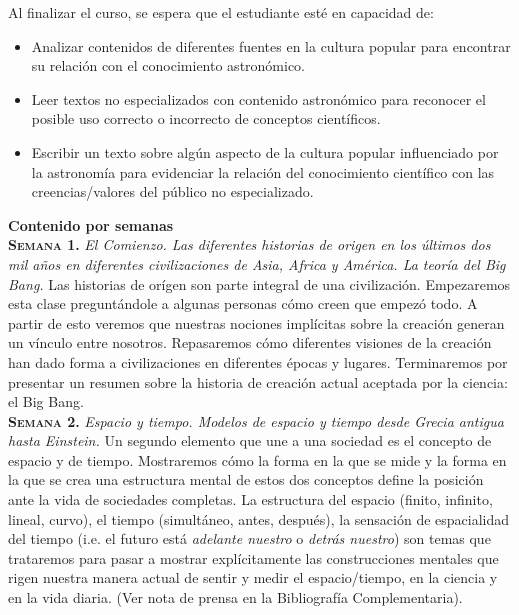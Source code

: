 \documentclass[letterpaper,10pt,onecolumn]{article}
\begin{document}

\noindent\normalsize Al finalizar el curso, se espera que el
estudiante est\'e en capacidad de: 

\begin{itemize}
\item Analizar contenidos de diferentes fuentes en la cultura popular
  para encontrar su relaci\'on con el conocimiento astron\'omico.\\[-0.6cm]
\item Leer textos no especializados con contenido astron\'omico para
  reconocer el posible uso correcto o incorrecto de conceptos cient\'ificos.
\\[-0.6cm]
\item Escribir un texto sobre alg\'un aspecto de la cultura popular
  influenciado por la astronom\'ia para evidenciar la relaci\'on del
  conocimiento cient\'ifico con las creencias/valores del p\'ublico no
  especializado.\\[-0.2cm]  
\end{itemize}

\noindent\textbf{\large {} \quad Contenido por
  semanas}\\[-0.2cm] 


\noindent\normalsize \textbf{\textsc{Semana 1.}} \textit{El Comienzo. Las
diferentes historias de origen en los \'ultimos dos mil a\~nos
en diferentes civilizaciones de Asia, Africa y Am\'erica. La teor\'ia
del Big Bang.} Las historias de or\'igen son parte integral de una
civilizaci\'on. Empezaremos esta clase pregunt\'andole a algunas
personas c\'omo creen que empez\'o todo. A partir de esto veremos que
nuestras nociones impl\'icitas sobre la creaci\'on generan un
v\'inculo entre nosotros. Repasaremos c\'omo diferentes visiones de la
creaci\'on han dado forma a civilizaciones en diferentes
\'epocas y lugares. Terminaremos por presentar un resumen sobre la
historia de creaci\'on actual aceptada por la ciencia: el Big Bang.\\[-0.3cm]   


\noindent\textbf{\textsc{Semana 2.}} \textit{Espacio y tiempo. Modelos de
espacio y tiempo desde Grecia antigua hasta Einstein.} Un segundo
elemento que une a una sociedad es el concepto de espacio y de
tiempo. Mostraremos c\'omo la forma en la que se mide y la forma en la que se crea una
estructura mental de estos dos conceptos define la
posici\'on ante la vida de sociedades completas. La estructura del
espacio (finito, infinito, lineal, curvo), el tiempo (simult\'aneo,
antes, despu\'es), la sensaci\'on de espacialidad del tiempo (i.e. el
futuro est\'a \emph{adelante nuestro} o \emph{detr\'as   nuestro}) son
temas que trataremos para pasar a mostrar expl\'icitamente las
construcciones mentales que rigen nuestra manera actual de sentir y
medir el espacio/tiempo, en la ciencia y en la vida diaria. (Ver nota
de prensa en la Bibliograf\'ia Complementaria).\\[-0.3cm]  
\end{document}
